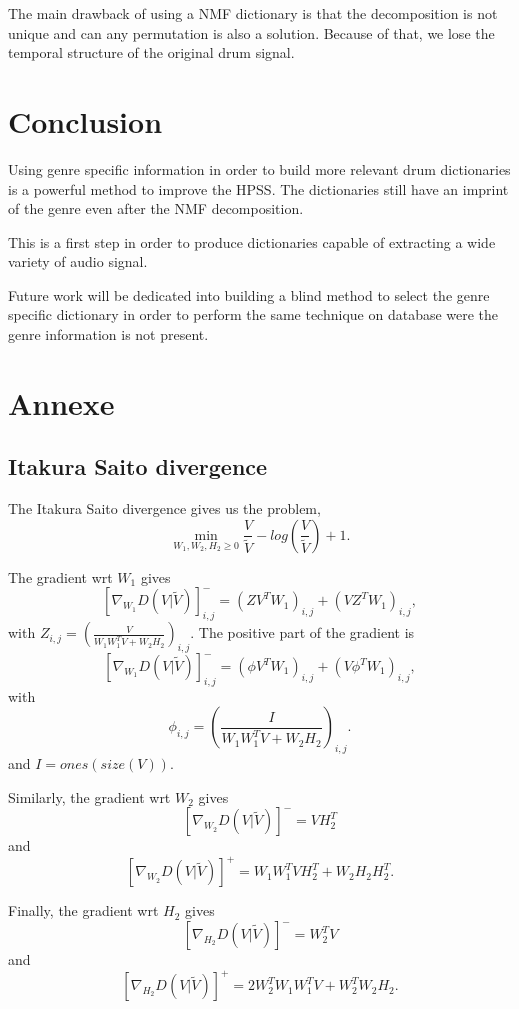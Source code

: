 \documentclass{article}
\begin{document}
The main drawback of using a NMF dictionary is that the decomposition is not unique and can any permutation is also a solution. Because of that, we lose the temporal structure of the original drum signal. 



\section{Conclusion}

Using genre specific information in order to build more relevant drum dictionaries is a powerful method to improve the HPSS. The dictionaries still have an imprint of the genre even after the NMF decomposition. 

This is a first step in order to produce dictionaries capable of extracting a wide variety of audio signal.

Future work will be dedicated into building a blind method to select the genre specific dictionary in order to perform the same technique on database were the genre information is not present. 



\section{Annexe}
 
\subsection{Itakura Saito divergence}\label{ISdisteq}
The Itakura Saito divergence gives us the problem,
$$\min_{W_1,W_2,H_2 \geq 0} \frac{V}{\tilde{V}} - log(\frac{V}{\tilde{V}}) +1.$$

The gradient wrt $W_1$ gives
$$[\nabla_{W_1} D(V|\tilde{V})]_{i,j}^{-} = (ZV^TW_1)_{i,j} + (VZ^TW_1)_{i,j},$$
with $Z_{i,j} = (\frac{V}{W_1W_1^TV + W_2H_2})_{i,j}$. 
The positive part of the gradient is
$$[\nabla_{W_1} D(V|\tilde{V})]_{i,j}^{-} = (\phi V^TW_1)_{i,j} + (V \phi^T W_1)_{i,j},$$
with $$ \phi_{i,j} = (\frac{I}{W_1W_1^TV + W_2H_2})_{i,j}.$$ and $I = ones(size(V))$.


Similarly, the gradient wrt $W_2$ gives
$$ [\nabla_{W_2} D(V|\tilde{V})]^{-} = VH_2^T $$
and
$$ [\nabla_{W_2} D(V|\tilde{V})]^{+} = W_1W_1^TVH_2^T + W_2H_2H_2^T.$$

Finally, the gradient wrt $H_2$ gives
$$ [\nabla_{H_2} D(V|\tilde{V})]^{-} = W_2^TV  $$
and
$$ [\nabla_{H_2} D(V|\tilde{V})]^{+} = 2W_2^TW_1W_1^TV + W_2^TW_2H_2. $$






%
%
%
%
\end{document}

